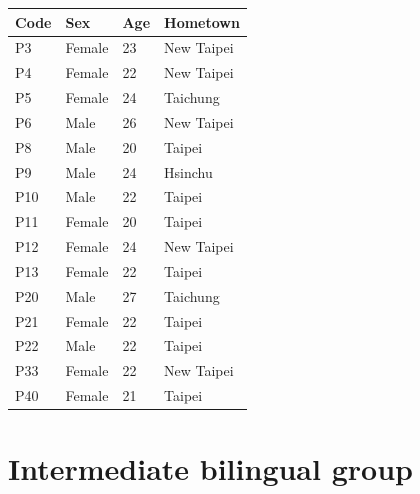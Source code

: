 \documentclass[12pt]{report}
\begin{document}
\begin{CJK}{UTF8}{bsmi}
\begin{flushleft}
\begin{table}[hbt!]
\begin{tabularx}{\textwidth}{|l||X|X|X|}
\hline
Code&Sex&Age&Hometown\\
\hline
\hline
P3&Female&23&New Taipei\\
\hline
P4&Female&22&New Taipei\\
\hline
P5&Female&24&Taichung\\
\hline
P6&Male&26&New Taipei\\
\hline
P8&Male&20&Taipei\\
\hline
P9&Male&24&Hsinchu\\
\hline
P10&Male&22&Taipei\\
\hline
P11&Female&20&Taipei\\
\hline
P12&Female&24&New Taipei\\
\hline
P13&Female&22&Taipei\\
\hline
P20&Male&27&Taichung\\
\hline
P21&Female&22&Taipei\\
\hline
P22&Male&22&Taipei\\
\hline
P33&Female&22&New Taipei\\
\hline
P40&Female&21&Taipei\\
\hline

\end{tabularx}
\end{table}
\end{flushleft}

\pagebreak
\section{Intermediate bilingual group}


\end{CJK}
\end{document}
